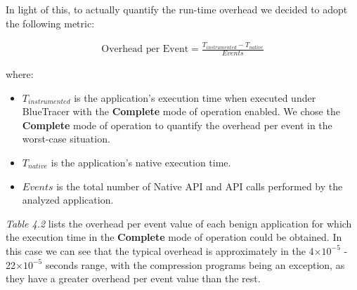 In light of this, to actually quantify the run-time overhead we decided to adopt the following metric:

\begin{align*}
\text{Overhead per Event} = \frac{T_{instrumented} - T_{native}}{Events}
\end{align*}

where:
\begin{itemize}
\item $T_{instrumented}$ is the application's execution time when executed under BlueTracer with the \textbf{Complete} mode of operation enabled. We chose the \textbf{Complete} mode of operation to quantify the overhead per event in the worst-case situation.
\item $T_{native}$ is the application's native execution time.
\item $Events$ is the total number of Native API and API calls performed by the analyzed application.
\end{itemize}

\textit{Table 4.2} lists the overhead per event value of each benign application for which the execution time in the \textbf{Complete} mode of operation could be obtained. In this case we can see that the typical overhead is approximately in the 4$\times10^{-5}$ - 22$\times10^{-5}$ seconds range, with the compression programs being an exception, as they have a greater overhead per event value than the rest.

